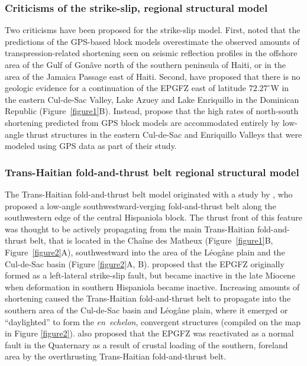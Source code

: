 \documentclass[linenumbers,draft]{agujournal}
\begin{document}
\subsubsection{Criticisms of the strike-slip, regional structural model}
Two criticisms have been proposed for the strike-slip model. First, \citet{corbeau2016transpressive} noted that the predictions of the GPS-based block models overestimate the observed amounts of transpression-related shortening seen on seismic reflection profiles in the offshore area of the Gulf of Gon\^ave north of the southern peninsula of Haiti, or in the area of the Jamaica Passage east of Haiti. Second, \citet{symithe2016present} have proposed that there is no geologic evidence for a continuation of the EPGFZ east of latitude $72.27^{\circ}$W in the eastern Cul-de-Sac Valley, Lake Azuey and Lake Enriquillo in the Dominican Republic (Figure~\ref{figure1}B). Instead, \citet{symithe2016present} propose that the high rates of north-south shortening predicted from GPS block models are accommodated entirely by low-angle thrust structures in the eastern Cul-de-Sac and Enriquillo Valleys that were modeled using GPS data as part of their study.

\subsubsection{Trans-Haitian fold-and-thrust belt regional structural model}
The Trans-Haitian fold-and-thrust belt model originated with a study by \citet{pubellier2000plate}, who proposed a low-angle southwestward-verging fold-and-thrust belt along the southwestern edge of the central Hispaniola block. The thrust front of this feature was thought to be actively propagating from the main Trans-Haitian fold-and-thrust belt, that is located in the Cha\^ine des Matheux (Figure~\ref{figure1}B, Figure~\ref{figure2}A), southwestward into the area of the L\'eog\^ane plain and the Cul-de-Sac basin (Figure \ref{figure2}A, B). \citet{pubellier2000plate} proposed that the EPGFZ originally formed as a left-lateral strike-slip fault, but became inactive in the late Miocene when deformation in southern Hispaniola became inactive. Increasing amounts of shortening caused the Trans-Haitian fold-and-thrust belt to propagate into the southern area of the Cul-de-Sac basin and L\'eog\^ane plain, where it emerged or ``daylighted'' to form the \textit{en~echelon}, convergent structures (compiled on the map in Figure \ref{figure2}). \citet{pubellier2000plate} also proposed that the EPGFZ was reactivated as a normal fault in the Quaternary as a result of crustal loading of the southern, foreland area by the overthrusting Trans-Haitian fold-and-thrust belt. 
\end{document}
